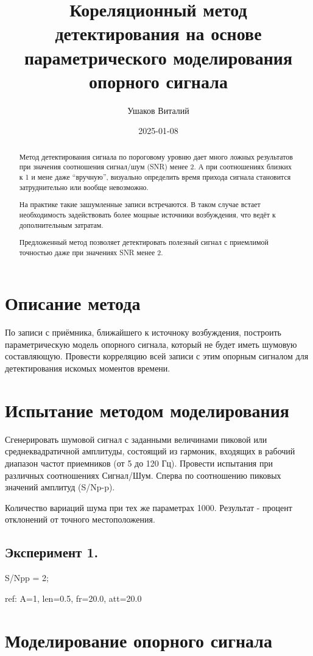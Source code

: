 \documentclass[a4paper,10pt]{article}
\title{Кореляционный метод детектирования на основе параметрического моделирования опорного сигнала}
\author{Ушаков Виталий}
\date{2025-01-08}
\begin{document}
\maketitle
\begin{abstract}
Метод детектирования сигнала по пороговому уровню дает много ложных результатов при значения соотношения сигнал/шум (SNR) менее 2. А при соотношениях близких к 1 и мене даже ``вручную'', визуально определить время прихода сигнала становится затруднительно или вообще невозможно.

На практике такие зашумленные записи встречаются. В таком случае встает необходимость задействовать более мощные источники возбуждения, что ведёт к дополнительным затратам.

Предложенный метод позволяет детектировать полезный сигнал с приемлимой точностью даже при значениях SNR менее 2.
\end{abstract}

\newpage
\section{Описание метода}
По записи с приёмника, ближайшего к источноку возбуждения, построить параметрическую модель опорного сигнала, который не будет иметь шумовую составляющую. Провести корреляцию всей записи с этим опорным сигналом для детектирования искомых моментов времени.

\newpage
\section{Испытание методом моделирования}
Сгенерировать шумовой сигнал с заданными величинами пиковой или среднеквадратичной амплитуды, состоящий из гармоник, входящих в рабочий диапазон частот приемников (от 5 до 120 Гц).
Провести испытания при различных соотношениях Сигнал/Шум. Сперва по соотношению пиковых значений амплитуд (S/Np-p).

Количество вариаций шума при тех же параметрах 1000.
Результат - процент отклонений от точного местоположения.


\subsection{Эксперимент 1.}

S/Npp = 2;

ref: A=1, len=0.5, fr=20.0, att=20.0

\newpage
\section{Моделирование опорного сигнала}
\end{document}
